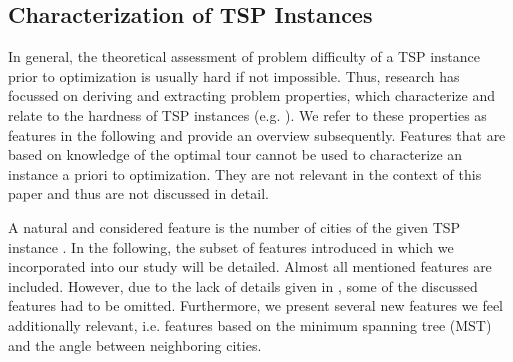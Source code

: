 \documentclass{article}
\begin{document}
\subsection{Characterization of TSP Instances}\label{subsec:feat}

In general, the theoretical assessment of problem difficulty of a TSP
instance prior to optimization is usually hard if not
impossible. Thus, research has focussed on deriving and extracting
problem properties, which characterize and relate to the hardness of
TSP instances (e.g. \cite{SMHL10,KCHS11,SH11,KM12}). We refer to these
properties as features in the following and provide an overview
subsequently. Features that are based on knowledge of the optimal tour
\cite{SS92,KSW05} cannot be used to characterize an instance a priori
to optimization. They are not relevant in the context of this paper
and thus are not discussed in detail.

A natural and considered feature is the number of cities  of the
given TSP instance \cite{SMHL10,KCHS11,SH11,KM12}. In the following,
the subset of features introduced in \cite{SMHL10,KCHS11,SH11,KM12} which we
incorporated into our study will be detailed. Almost all mentioned
features are included. However, due to the lack of details given in
\cite{KM12}, some of the discussed features had to be omitted.
Furthermore, we present several new features we feel additionally
relevant, i.e. features based on the minimum spanning tree (MST) and
the angle between neighboring cities.
\end{document}
